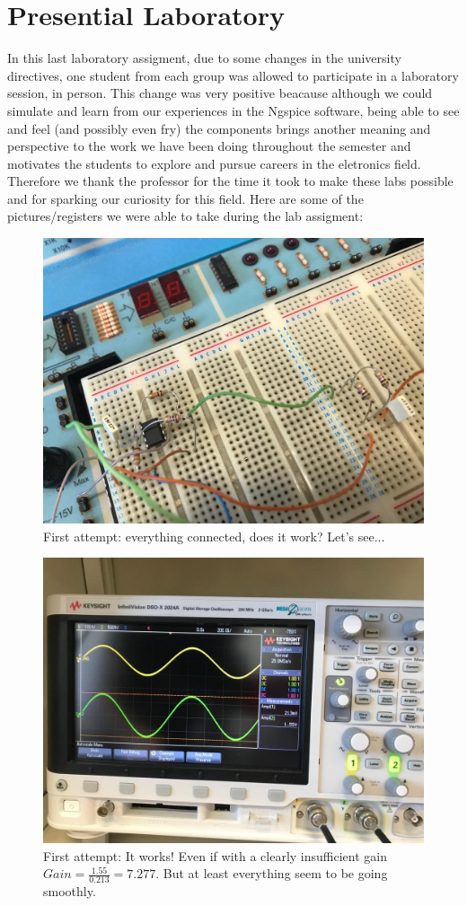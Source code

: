 \section{Presential Laboratory}
\label{sec:Presencial}

In this last laboratory assigment, due to some changes in the university directives, one student from each group was allowed to participate in a laboratory session, in person. This change was very positive beacause although we could simulate and learn from our experiences in the Ngspice software, being able to see and feel (and possibly even fry) the components brings another meaning and perspective to the work we have been doing throughout the semester and motivates the students to explore and pursue careers in the eletronics field. Therefore we thank the professor for the time it took to make these labs possible and for sparking our curiosity for this field. Here are some of the pictures/registers we were able to take during the lab assigment:  

\begin{figure}[H] \centering
\includegraphics[width=0.95\linewidth]{try1_diagram.jpeg}
\caption{First attempt: everything connected, does it work? Let's see...}
\label{fig:t11}
\end{figure}

  
\begin{figure}[H] \centering
\includegraphics[width=0.5\linewidth]{try1_results.jpeg}
\caption{First attempt: It works! Even if with a clearly insufficient gain $Gain = \frac{1.55}{0.213}=7.277$. But at least everything seem to be going smoothly.}
\label{fig:t12}
\end{figure}


